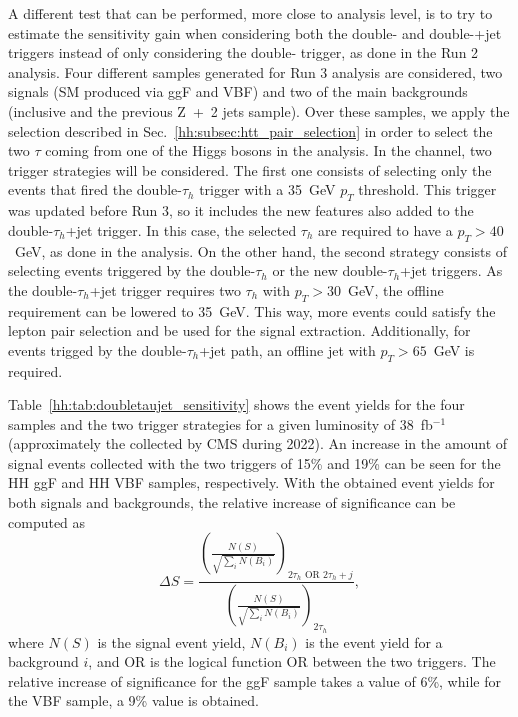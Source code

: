 \documentclass[../main.tex]{subfiles}
\begin{document}
A different test that can be performed, more close to analysis level, is to try to estimate the sensitivity gain when considering both the double-\tauh{} and double-\tauh{}+jet triggers instead of only considering the double-\tauh{} trigger, as done in the Run 2 \hhbbtt{} analysis. Four different samples generated for Run 3 analysis are considered, two signals (SM \hhbbtt{} produced via ggF and VBF) and two of the main backgrounds (inclusive \ttbar{} and the previous Z~+~2 jets sample). Over these samples, we apply the selection described in Sec.~\ref{hh:subsec:htt_pair_selection} in order to select the two $\tau$ coming from one of the Higgs bosons in the \hhbbtt{} analysis. In the \tauh\tauh{} channel, two trigger strategies will be considered. The first one consists of selecting only the events that fired the double-$\tau_h$ trigger with a 35~GeV $p_T$ threshold. This trigger was updated before Run 3, so it includes the new features also added to the double-$\tau_h$+jet trigger. In this case, the selected $\tau_h$ are required to have a $p_T>40$~GeV, as done in the \hhbbtt{} analysis. On the other hand, the second strategy consists of selecting events triggered by the double-$\tau_h$ or the new double-$\tau_h$+jet triggers. As the double-$\tau_h$+jet trigger requires two $\tau_h$ with $p_T>30$~GeV, the offline requirement can be lowered to 35~GeV. This way, more events could satisfy the lepton pair selection and be used for the signal extraction.  Additionally, for events trigged by the double-$\tau_h$+jet path, an offline jet with $p_T>65$~GeV is required.

Table~\ref{hh:tab:doubletaujet_sensitivity} shows the event yields for the four samples and the two trigger strategies for a given luminosity of 38~fb${}^{-1}$ (approximately the collected by CMS during 2022). An increase in the amount of signal events collected with the two triggers of 15\% and 19\% can be seen for the HH ggF and HH VBF samples, respectively. With the obtained event yields for both signals and backgrounds, the relative increase of significance can be computed as
\begin{equation}
\Delta S = \frac{\left(\frac{N(S)}{\sqrt{\sum_i N(B_i)}}\right)_{2\tau_h \text{ OR } 2\tau_h+j}}{\left(\frac{N(S)}{\sqrt{\sum_i N(B_i)}}\right)_{2\tau_h}},
\end{equation}
where $N(S)$ is the signal event yield, $N(B_i)$ is the event yield for a background $i$, and OR is the logical function OR between the two triggers. The relative increase of significance for the ggF sample takes a value of 6\%, while for the VBF sample, a 9\% value is obtained.
\end{document}
